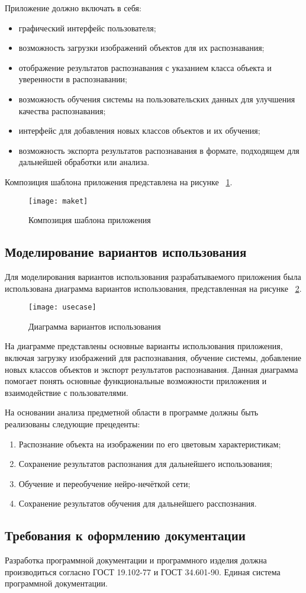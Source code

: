 Приложение должно включать в себя:
\begin{itemize}
    \item графический интерфейс пользователя;
    \item возможность загрузки изображений объектов для их распознавания;
    \item отображение результатов распознавания с указанием класса объекта и уверенности в распознавании;
    \item возможность обучения системы на пользовательских данных для улучшения качества распознавания;
    \item интерфейс для добавления новых классов объектов и их обучения;
    \item возможность экспорта результатов распознавания в формате, подходящем для дальнейшей обработки или анализа.
\end{itemize}

Композиция шаблона приложения представлена на рисунке ~\ref{maket:image}.

\begin{figure}[ht]
\texttt{[image: maket]}
\caption{Композиция шаблона приложения}
\label{maket:image}
\end{figure}

\subsection{Моделирование вариантов использования}

Для моделирования вариантов использования разрабатываемого приложения была использована диаграмма вариантов использования, представленная на рисунке ~\ref{usecase:image}.

\begin{figure}[ht]
\centering
\texttt{[image: usecase]}
\caption{Диаграмма вариантов использования}
\label{usecase:image}
\end{figure}

На диаграмме представлены основные варианты использования приложения, включая загрузку изображений для распознавания, обучение системы, добавление новых классов объектов и экспорт результатов распознавания. Данная диаграмма помогает понять основные функциональные возможности приложения и взаимодействие с пользователями.

На основании анализа предметной области в программе должны быть реализованы следующие прецеденты:
\begin{enumerate}
\item Распознание объекта на изображении по его цветовым характеристикам;
\item Сохранение результатов распознания для дальнейшего использования;
\item Обучение и переобучение нейро-нечёткой сети;
\item Сохранение результатов обучения для дальнейшего расспознания.
\end{enumerate}

\subsection{Требования к оформлению документации}

Разработка программной документации и программного изделия должна производиться согласно ГОСТ 19.102-77 и ГОСТ 34.601-90. Единая система программной документации.
